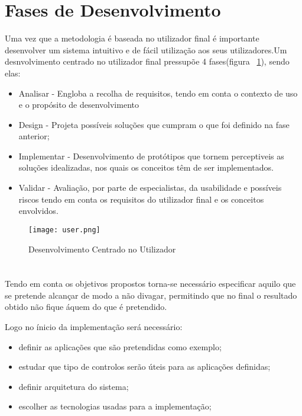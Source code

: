 \section{Fases de Desenvolvimento}

Uma vez que a metodologia é baseada no utilizador final é importante desenvolver um sistema intuitivo e de fácil utilização aos seus utilizadores.Um desnvolvimento centrado no utilizador final pressupõe 4 fases(figura ~\ref{fig:user-center}), sendo elas:
\begin{itemize}
\item Analisar - Engloba a recolha de requisitos, tendo em conta o contexto de uso e o propósito de desenvolvimento
\item Design - Projeta possíveis soluções que cumpram o que foi definido na fase anterior;
\item Implementar - Desenvolvimento de protótipos que tornem perceptiveis as soluções idealizadas, nos quais os conceitos têm de ser implementados.
\item Validar - Avaliação, por parte de especialistas, da usabilidade e possíveis riscos tendo em conta os requisitos do utilizador final e os conceitos envolvidos.
\end{itemize} 

\begin{figure}[h]
\centering
\texttt{[image: user.png]}
\caption[Desenvolvimento Centrado no Utilizador] {Desenvolvimento Centrado no Utilizador\protect\footnotemark}
\label{fig:user-center}
\end{figure}


\section{}

	Tendo em conta os objetivos propostos torna-se necessário especificar aquilo que se pretende alcançar de modo a não divagar, permitindo que no final o resultado obtido não fique áquem do que é pretendido.

	Logo no ínicio da implementação será necessário:
	\begin{itemize}
		\item definir as aplicações que são pretendidas como exemplo;
		\item estudar que tipo de controlos serão úteis para as aplicações definidas;
		\item definir arquitetura do sistema;
		\item escolher as tecnologias usadas para a implementação;
	\end{itemize}  


